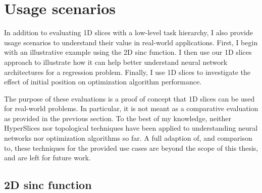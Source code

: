 
\section{Usage scenarios}\label{sec:usage-scenarios}

In addition to evaluating 1D slices with a low-level task hierarchy, I also
provide usage scenarios to understand their value in real-world applications.
First, I begin with an illustrative example using the 2D sinc
function.
I then use our 1D slices approach to illustrate how
it can help better understand neural network architectures for a regression
problem. Finally, I use 1D slices to investigate the effect of initial
position on optimization algorithm performance.

The purpose of these evaluations is a proof of concept that 1D slices can be
used for real-world problems. In particular, it is not meant as a comparative
evaluation as provided in the previous section. To the best of my knowledge,
neither HyperSlices nor topological techniques have been applied to
understanding neural networks nor optimization algorithms so far. A full
adaption of, and comparison to, these techniques for the provided use cases are
beyond the scope of this thesis, and are left for future work. 

\subsection{2D sinc function}

